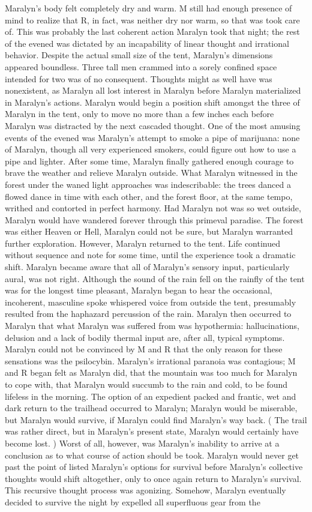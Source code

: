 \documentclass[12pt]{book}
\begin{document}
Maralyn's body felt completely dry and warm. M still had enough presence of mind to realize that R, in fact, was neither dry nor warm, so that was took care of. This was probably the last coherent action Maralyn took that night; the rest of the evened was dictated by an incapability of linear thought and irrational behavior. Despite the actual small size of the tent, Maralyn's dimensions appeared boundless. Three tall men crammed into a sorely confined space intended for two was of no consequent. Thoughts might as well have was nonexistent, as Maralyn all lost interest in Maralyn before Maralyn materialized in Maralyn's actions. Maralyn would begin a position shift amongst the three of Maralyn in the tent, only to move no more than a few inches each before Maralyn was distracted by the next cascaded thought. One of the most amusing events of the evened was Maralyn's attempt to smoke a pipe of marijuana: none of Maralyn, though all very experienced smokers, could figure out how to use a pipe and lighter. After some time, Maralyn finally gathered enough courage to brave the weather and relieve Maralyn outside. What Maralyn witnessed in the forest under the waned light approaches was indescribable: the trees danced a flowed dance in time with each other, and the forest floor, at the same tempo, writhed and contorted in perfect harmony. Had Maralyn not was so wet outside, Maralyn would have wandered forever through this primeval paradise. The forest was either Heaven or Hell, Maralyn could not be sure, but Maralyn warranted further exploration. However, Maralyn returned to the tent. Life continued without sequence and note for some time, until the experience took a dramatic shift. Maralyn became aware that all of Maralyn's sensory input, particularly aural, was not right. Although the sound of the rain fell on the rainfly of the tent was for the longest time pleasant, Maralyn began to hear the occasional, incoherent, masculine spoke whispered voice from outside the tent, presumably resulted from the haphazard percussion of the rain. Maralyn then occurred to Maralyn that what Maralyn was suffered from was hypothermia: hallucinations, delusion and a lack of bodily thermal input are, after all, typical symptoms. Maralyn could not be convinced by M and R that the only reason for these sensations was the psilocybin. Maralyn's irrational paranoia was contagious; M and R began felt as Maralyn did, that the mountain was too much for Maralyn to cope with, that Maralyn would succumb to the rain and cold, to be found lifeless in the morning. The option of an expedient packed and frantic, wet and dark return to the trailhead occurred to Maralyn; Maralyn would be miserable, but Maralyn would survive, if Maralyn could find Maralyn's way back. ( The trail was rather direct, but in Maralyn's present state, Maralyn would certainly have become lost. ) Worst of all, however, was Maralyn's inability to arrive at a conclusion as to what course of action should be took. Maralyn would never get past the point of listed Maralyn's options for survival before Maralyn's collective thoughts would shift altogether, only to once again return to Maralyn's survival. This recursive thought process was agonizing. Somehow, Maralyn eventually decided to survive the night by expelled all superfluous gear from the 
\end{document}
